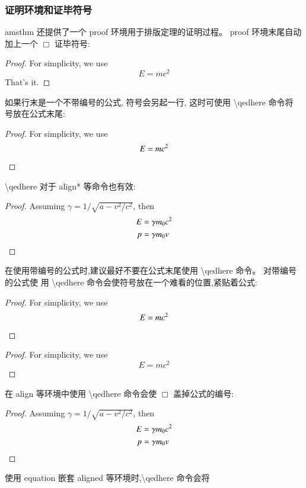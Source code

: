 \documentclass[a4paper]{ctexart}
\begin{document}
    \subsubsection{证明环境和证毕符号}
    amsthm 还提供了一个 proof 环境用于排版定理的证明过程。%
    proof 环境末尾自动加上一个 $\Box$ 证毕符号:
    \renewcommand{\proofname}{\indent \textit{Proof}}
    \begin{proof}
        For simplicity, we use
        \[ E = mc^2 \]
        That's it.
    \end{proof}
    如果行末是一个不带编号的公式, 符号会另起一行,%
    这时可使用 \textbackslash qedhere 命令将 号放在公式末尾:
    \begin{proof}
        For simplicity, we use
        \[ E = mc^2 \qedhere \] 
    \end{proof}
    \textbackslash qedhere 对于 align* 等命令也有效:
    \begin{proof}
        Assuming $\gamma = 1/\sqrt{a-v^2/c^2}$, then
        \begin{align*}
            E & = \gamma m_0 c^2    \\
            p & = \gamma m_0 v \qedhere
        \end{align*}
    \end{proof}
    在使用带编号的公式时,建议最好不要在公式末尾使用 \textbackslash qedhere 命令。%
    对带编号的公式使 用 \textbackslash qedhere 命令会使符号放在一个难看的位置,紧贴着公式:
    \begin{proof}
        For simplicity, we use
        \begin{equation}
            E = mc^2 \qedhere
        \end{equation}
    \end{proof}
    \begin{proof} For simplicity, we use 
        \begin{equation} 
            E = mc^2 
        \end{equation} 
    \end{proof}
    在 align 等环境中使用 \textbackslash qedhere 命令会使 $\Box$ 盖掉公式的编号:
    \begin{proof}
        Assuming $\gamma = 1/\sqrt{a-v^2/c^2}$, then 
        \begin{align} 
            E & = \gamma m_0 c^2 \\ 
            p & = \gamma m_0 v \qedhere 
        \end{align}
    \end{proof}
    使用 equation 嵌套 aligned 等环境时,\textbackslash qedhere 命令会将%
\end{document}
